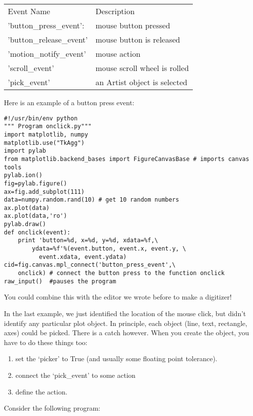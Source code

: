 \begin{tabular}{l|l}
\hline
Event Name & Description\\
 'button\_press\_event':  &  mouse button pressed\\
 'button\_release\_event'&mouse button is released\\
 'motion\_notify\_event'&mouse action\\
 'scroll\_event' & mouse scroll wheel is rolled\\
 'pick\_event'& an Artist object is selected\\
 \hline
 \end{tabular}
 
Here is an example of a button press event:


{\singlespacing \color{blue} \begin{verbatim}
#!/usr/bin/env python
""" Program onclick.py"""
import matplotlib, numpy
matplotlib.use("TkAgg")
import pylab
from matplotlib.backend_bases import FigureCanvasBase # imports canvas tools
pylab.ion()  
fig=pylab.figure()
ax=fig.add_subplot(111)
data=numpy.random.rand(10) # get 10 random numbers
ax.plot(data)
ax.plot(data,'ro')
pylab.draw()
def onclick(event):
    print 'button=%d, x=%d, y=%d, xdata=%f,\
        ydata=%f'%(event.button, event.x, event.y, \
          event.xdata, event.ydata)
cid=fig.canvas.mpl_connect('button_press_event',\
    onclick) # connect the button press to the function onclick
raw_input()  #pauses the program
\end{verbatim}}


You could combine this with the editor  we wrote before to make a digitizer! 


In the last example, we just identified the location of the mouse click, but didn't identify any particular plot object.   In principle, each object (line, text, rectangle, axes) could be picked.  
There is a catch however.   When you create the object, you have to do these things too:

\begin{enumerate}
\item set the `picker' to True (and usually some floating point tolerance).
\item connect the `pick\_event' to some action
\item define the action.
\end{enumerate}

Consider the following program:   

